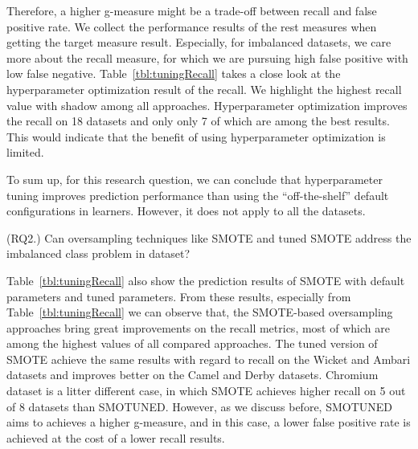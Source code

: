 Therefore, a higher g-measure might be a trade-off between recall and false positive rate. We collect the performance results of the rest measures when getting the target measure result. Especially, for imbalanced datasets, we care more about the recall measure, for which we are pursuing high false positive with low false negative. Table~\ref{tbl:tuningRecall} takes a close look at the hyperparameter optimization result of the recall. We highlight the highest recall value with shadow among all approaches. Hyperparameter optimization improves the recall on 18 datasets and only only 7 of which are among the best results. This would indicate that the benefit of using hyperparameter optimization is limited.

To sum up, for this research question, we can conclude that hyperparameter tuning  improves prediction performance than using the ``off-the-shelf'' default configurations in learners. However, it does not apply to all the datasets.




\begin{tcolorbox}[enhanced,width=3.4in,size=fbox,
    fontupper=\normalsize\bfseries,drop shadow southwest,sharp corners]
(RQ2.) Can oversampling techniques like SMOTE and tuned SMOTE address the imbalanced class problem in dataset?
\end{tcolorbox}

Table~\ref{tbl:tuningRecall} also show the prediction results of SMOTE with default parameters and tuned parameters. From these results, especially from Table~\ref{tbl:tuningRecall} we can observe that, the SMOTE-based oversampling approaches bring great improvements on the recall metrics, most of which are among the highest values of all compared approaches. The tuned version of SMOTE achieve the same results with regard to recall on the Wicket and Ambari datasets and improves better on the Camel and Derby datasets. Chromium dataset is a litter different case, in which SMOTE achieves higher recall on 5 out of 8 datasets than SMOTUNED. However, as we discuss before, SMOTUNED aims to achieves a higher g-measure, and in this case, a lower false positive rate is achieved at the cost of a lower recall results.



